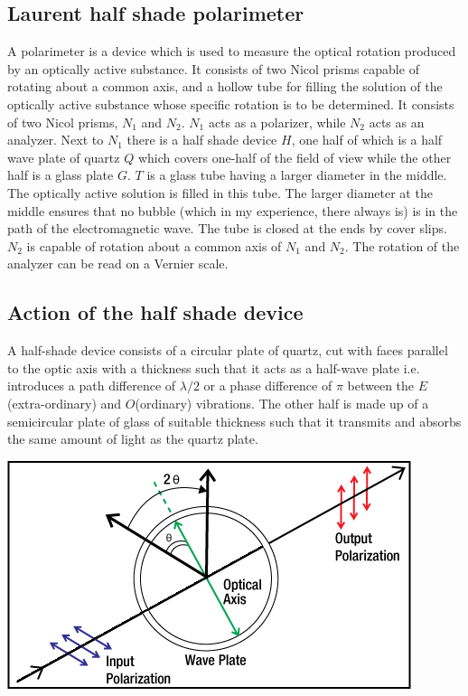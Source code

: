 \documentclass{dkpinto-report}
\begin{document}
\subsection{Laurent half shade polarimeter}
A polarimeter is a device which is used to measure the optical rotation produced by an optically active substance. It consists of two Nicol prisms capable of rotating about a common axis, and a hollow tube for filling the solution of the optically active substance whose specific rotation is to be determined. It consists of two Nicol prisms, $N_1$ and $N_2$. $N_1$ acts as a polarizer, while $N_2$ acts as an analyzer. Next to $N_1$ there is a half shade device $H$, one half of which is a half wave plate of quartz $Q$ which covers one-half of the field of view while the other half is a glass plate $G$. $T$ is a glass tube having a larger diameter in the middle. The optically active solution is filled in this tube. The larger diameter at the middle ensures that no bubble (which in my experience, there always is) is in the path of the electromagnetic wave. The tube is closed at the ends by cover slips. $N_2$ is capable of rotation about a common axis of $N_1$ and $N_2$. The rotation of the analyzer can be read on a Vernier scale.   

\subsection{Action of the half shade device}
A half-shade device consists of a circular plate of quartz, cut with faces parallel to the optic axis with a thickness such that it acts as a half-wave plate i.e. introduces a path difference of $\lambda / 2$ or a phase difference of $\pi$ between the $E$(extra-ordinary) and $O$(ordinary) vibrations. The other half is made up of a semicircular plate of glass of suitable thickness such that it transmits and absorbs the same amount of light as the quartz plate.

\begin{center}
\includegraphics[scale=0.4]{Images/half_plate.png}
\end{center}
\end{document}

